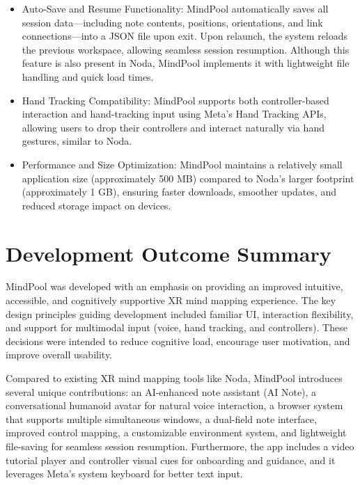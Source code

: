 \documentclass{CPP}
\begin{document}
\begin{itemize}
    \item Auto-Save and Resume Functionality: MindPool automatically saves all session data—including note contents, positions, orientations, and link connections—into a JSON file upon exit. Upon relaunch, the system reloads the previous workspace, allowing seamless session resumption. Although this feature is also present in Noda, MindPool implements it with lightweight file handling and quick load times.
    \item Hand Tracking Compatibility: MindPool supports both controller-based interaction and hand-tracking input using Meta’s Hand Tracking APIs, allowing users to drop their controllers and interact naturally via hand gestures, similar to Noda.
    \item Performance and Size Optimization: MindPool maintains a relatively small application size (approximately 500 MB) compared to Noda’s larger footprint (approximately 1 GB), ensuring faster downloads, smoother updates, and reduced storage impact on devices.
\end{itemize}

\section{Development Outcome Summary}

MindPool was developed with an emphasis on providing an improved intuitive, accessible, and cognitively supportive XR mind mapping experience. The key design principles guiding development included familiar UI, interaction flexibility, and support for multimodal input (voice, hand tracking, and controllers). These decisions were intended to reduce cognitive load, encourage user motivation, and improve overall usability.

Compared to existing XR mind mapping tools like Noda, MindPool introduces several unique contributions: an AI-enhanced note assistant (AI Note), a conversational humanoid avatar for natural voice interaction, a browser system that supports multiple simultaneous windows, a dual-field note interface, improved control mapping, a customizable environment system, and lightweight file-saving for seamless session resumption. Furthermore, the app includes a video tutorial player and controller visual cues for onboarding and guidance, and it leverages Meta’s system keyboard for better text input.

\end{document}
